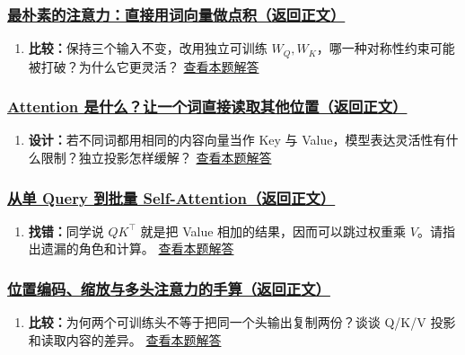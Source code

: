 \subsubsection*{\hyperref[check:21c-naive-attention]{最朴素的注意力：直接用词向量做点积（返回正文）}}\begin{enumerate}[label={},leftmargin=4.8em,itemsep=4pt]
\item[\textbf{C4-20.}] \label{exercise:C4-20}\label{extension:21c-naive-attention:4}\textbf{比较：}保持三个输入不变，改用独立可训练 $W_Q,W_K$，哪一种对称性约束可能被打破？为什么它更灵活？ \hyperref[answerpiece:21c-naive-attention:4]{查看本题解答}
\end{enumerate}

\subsubsection*{\hyperref[check:21b-why-attention]{Attention 是什么？让一个词直接读取其他位置（返回正文）}}\begin{enumerate}[label={},leftmargin=4.8em,itemsep=4pt]
\item[\textbf{C4-21.}] \label{exercise:C4-21}\label{extension:21b-why-attention:4}\textbf{设计：}若不同词都用相同的内容向量当作 Key 与 Value，模型表达灵活性有什么限制？独立投影怎样缓解？ \hyperref[answerpiece:21b-why-attention:4]{查看本题解答}
\end{enumerate}

\subsubsection*{\hyperref[check:11-softmax-memory]{从单 Query 到批量 Self-Attention（返回正文）}}\begin{enumerate}[label={},leftmargin=4.8em,itemsep=4pt]
\item[\textbf{C4-22.}] \label{exercise:C4-22}\label{extension:11-softmax-memory:4}\textbf{找错：}同学说 $QK^\top$ 就是把 Value 相加的结果，因而可以跳过权重乘 $V$。请指出遗漏的角色和计算。 \hyperref[answerpiece:11-softmax-memory:4]{查看本题解答}
\end{enumerate}

\subsubsection*{\hyperref[check:22a-position-multihead]{位置编码、缩放与多头注意力的手算（返回正文）}}\begin{enumerate}[label={},leftmargin=4.8em,itemsep=4pt]
\item[\textbf{C4-23.}] \label{exercise:C4-23}\label{extension:22a-position-multihead:4}\textbf{比较：}为何两个可训练头不等于把同一个头输出复制两份？谈谈 Q/K/V 投影和读取内容的差异。 \hyperref[answerpiece:22a-position-multihead:4]{查看本题解答}
\end{enumerate}


